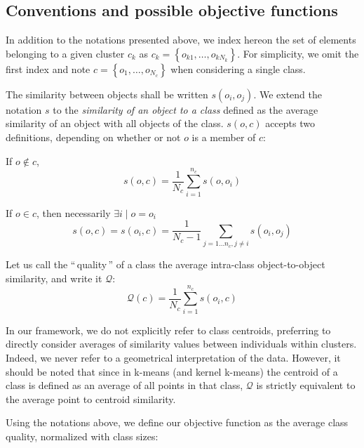 \documentclass[twoside,11pt]{article}
\newcommand{\gl}[1]{``\,#1\,''} %
\begin{document}
\subsection{Conventions and possible objective functions}

In addition to the notations presented above, we index hereon the set of elements belonging to a given cluster $c_k$ as $c_k = \left\{o_{k1}, \ldots, o_{kN_k}\right\}$. 
For simplicity, we omit the first index and note $c = \left\{o_1, \ldots, o_{N_c}\right\}$ when considering a single class. 

The similarity between objects shall be written $s\left(o_i, o_j\right)$.
We extend the notation $s$ to the \emph{similarity of an object to a
  class} defined as the average similarity of an object
with all objects of the class. $s(o,c)$ accepts two definitions,
depending on whether or not $o$ is a member of $c$:

If $o \notin c$,
\begin{equation}
  s\left(o,c\right) = \frac{1}{N_c} \sum_{i=1}^{n_c}s\left(o, o_i\right)
   \label{eq:soc_notinclass}
\end{equation}

If $o \in c$, then necessarily $\exists i \mid o = o_i$
\begin{equation}
  s\left(o,c\right) = s\left(o_i, c\right) = \frac{1}{N_c-1} \sum_{j=1 \ldots n_c, j \neq i} s\left(o_i, o_j\right)
  	 \label{eq:soc_inclass}
\end{equation}

Let us call the \gl{quality} of a class the average intra-class object-to-object similarity, and write it $\mathcal{Q}$:
\[
\mathcal{Q}\left(c\right) = \frac{1}{N_c} \sum_{i=1}^{n_c} s\left(o_i, c\right)
\]

In our framework, we do not explicitly refer to class centroids, preferring to directly consider averages of similarity values between individuals within clusters. Indeed, we never refer to a geometrical interpretation of the data. However, it should be noted that since in k-means (and kernel k-means) the centroid of a class is defined as an average of all points in that class, $\mathcal{Q}$ is strictly equivalent to the average point to centroid similarity.

Using the notations above, we define our objective function as the average class quality, %
normalized with class sizes:
\end{document}
